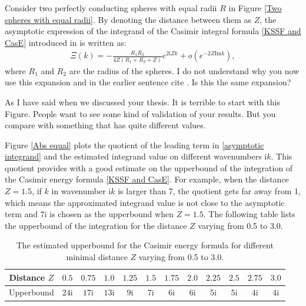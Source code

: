 Consider two perfectly conducting spheres with equal radii $R$ in Figure \ref{Two spheres with equal radii}. By denoting the distance between them as $Z$, 
the asymptotic expression of the integrand of the Casimir integral formula \eqref{KSSF and CasE} introduced in \cite{fang2021singularity} is written as:
\begin{align}\label{asymptotic integrand}
    \Xi(k) = -\frac{R_{1}R_{2}}{4Z(R_{1} + R_{2} + Z)}e^{2\mathrm{i}Zk} + o\left(e^{-2Z\text{Im}k}\right),
\end{align}
where $R_{1}$ and $R_{2}$ are the radius of the spheres.
{\color{red} I do not understand why you now use this expansion and in the earlier sentence cite \cite{emig2008casimir}. Is this the same expansion?}

{\color{red} As I have said when we discussed your thesis. It is terrible to start with this Figure. People want to see some kind of validation of your results.
But you compare with something that has quite different values.}

Figure \ref{Abs equal} plots the quotient of the leading term in \eqref{asymptotic integrand} and the estimated integrand value on different 
wavenumbers $\mathrm{i}k$. This quotient provides with a good estimate on the upperbound of the integration of the Casimir energy formula \eqref{KSSF and CasE}. 
For example, when the distance $Z = 1.5$, if $k$ in wavenumber $\mathrm{i}k$ is larger than 7, the quotient gets far away from 1, which means the approximated 
integrand value is not close to the asymptotic term and $7\mathrm{i}$ is chosen as the upperbound when $Z = 1.5$. The following table lists the upperbound 
of the integration for the distance $Z$ varying from 0.5 to 3.0.

\begin{table}[H]
    \centering
    \begin{tabular}{ |c|c|c|c|c|c|c|c|c|c|c|c| }
        \hline
        Distance $Z$ & $ 0.5$ & $ 0.75$  & $ 1.0$ & $1.25$ & $ 1.5$ & $1.75$  & $2.0$ & $2.25$ & $ 2.5$ & $ 2.75$  & $3.0$ \\\hline
        Upperbound & $24\mathrm{i}$ & $17\mathrm{i}$ & $13\mathrm{i}$ & $9\mathrm{i}$ & $7\mathrm{i}$ & $6\mathrm{i}$ & $6\mathrm{i}$ & $5\mathrm{i}$ & $5\mathrm{i}$ & $4\mathrm{i}$ & $4\mathrm{i}$ \\\hline
       \end{tabular}
       \caption{\label{Equal: distance and upperbound} The estimated upperbound for the Casimir energy formula for different minimal distance $Z$ varying from 
       0.5 to 3.0.}
\end{table}
 

